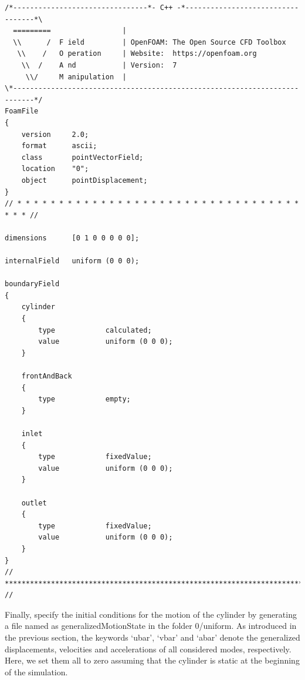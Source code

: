 \begin{lstlisting}
/*--------------------------------*- C++ -*----------------------------------*\
  =========                 |
  \\      /  F ield         | OpenFOAM: The Open Source CFD Toolbox
   \\    /   O peration     | Website:  https://openfoam.org
    \\  /    A nd           | Version:  7
     \\/     M anipulation  |
\*---------------------------------------------------------------------------*/
FoamFile
{
    version     2.0;
    format      ascii;
    class       pointVectorField;
    location    "0";
    object      pointDisplacement;
}
// * * * * * * * * * * * * * * * * * * * * * * * * * * * * * * * * * * * * * //

dimensions      [0 1 0 0 0 0 0];

internalField   uniform (0 0 0);

boundaryField
{
    cylinder
    {
        type            calculated;
        value           uniform (0 0 0);
    }

    frontAndBack
    {
        type            empty;
    }

    inlet
    {
        type            fixedValue;
        value           uniform (0 0 0);
    }

    outlet
    {
        type            fixedValue;
        value           uniform (0 0 0);
    }
}
// ************************************************************************* //
\end{lstlisting}

\noindent  Finally, specify the initial conditions for the motion of the cylinder by generating a file named as generalizedMotionState in the folder 0/uniform. As introduced in the previous section, the keywords `ubar', `vbar' and `abar' denote the generalized displacements, velocities and accelerations of all considered modes, respectively. Here, we set them all to zero assuming that the cylinder is static at the beginning of the simulation.

